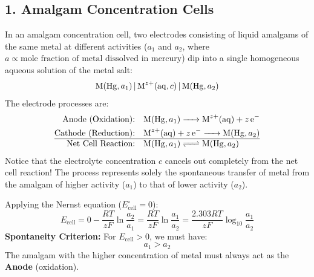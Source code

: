 \subsection{1. Amalgam Concentration Cells}
In an amalgam concentration cell, two electrodes consisting of liquid amalgams of the same metal at different activities ($a_1$ and $a_2$, where $a \propto \text{mole fraction of metal dissolved in mercury}$) dip into a single homogeneous aqueous solution of the metal salt:
\begin{equation}
    \ce{M(Hg, } a_1\ce{) | M^{z+}(aq, } c\ce{) | M(Hg, } a_2\ce{)}
\end{equation}
The electrode processes are:
\begin{align}
    \text{Anode (Oxidation):} \quad & \ce{M(Hg, } a_1\ce{) -> M^{z+}(aq) + z e^-} \\
    \text{Cathode (Reduction):} \quad & \ce{M^{z+}(aq) + z e^- -> M(Hg, } a_2\ce{)} \\
    \hline
    \text{Net Cell Reaction:} \quad & \ce{M(Hg, } a_1\ce{) <=> M(Hg, } a_2\ce{)}
\end{align}
Notice that the electrolyte concentration $c$ cancels out completely from the net cell reaction! The process represents solely the spontaneous transfer of metal from the amalgam of higher activity ($a_1$) to that of lower activity ($a_2$).

Applying the Nernst equation ($E^\circ_{\text{cell}} = 0$):
\begin{equation}
    E_{\text{cell}} = 0 - \frac{RT}{zF} \ln \frac{a_2}{a_1} = \boxed{\frac{RT}{zF} \ln \frac{a_1}{a_2} = \frac{2.303 RT}{zF} \log_{10} \frac{a_1}{a_2}}
\end{equation}
\textbf{Spontaneity Criterion:}
For $E_{\text{cell}} > 0$, we must have:
\begin{equation}
    \boxed{a_1 > a_2}
\end{equation}
The amalgam with the higher concentration of metal must always act as the \textbf{Anode} (oxidation).

